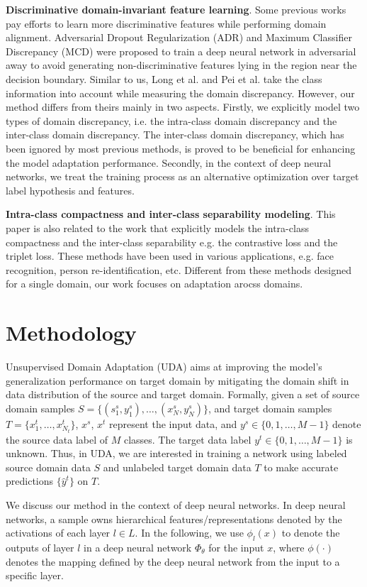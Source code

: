 \documentclass[conference]{IEEEtran}
\begin{document}
\textbf{Discriminative domain-invariant feature learning}. Some previous works pay efforts to learn more discriminative features while performing domain alignment.
Adversarial Dropout Regularization (ADR) and Maximum Classifier Discrepancy (MCD) were proposed to train a deep neural network in adversarial away to avoid generating non-discriminative features lying in the region near the decision boundary.
Similar to us, Long et al. and Pei et al. take the class information into account while measuring the domain discrepancy. However, our method differs from theirs mainly in two aspects.
Firstly, we explicitly model two types of domain discrepancy, i.e. the intra-class domain discrepancy and the inter-class domain discrepancy. The inter-class domain discrepancy, which has been ignored by most previous methods, 
is proved to be beneficial for enhancing the model adaptation performance. Secondly, in the context of deep neural networks, we treat the training process as an alternative optimization over target label hypothesis and features.

\textbf{Intra-class compactness and inter-class separability modeling}. This paper is also related to the work that explicitly models the intra-class compactness and the inter-class separability e.g. the contrastive loss and the triplet loss. These methods have been used in various applications, 
e.g. face recognition, person re-identification, etc. Different from these methods designed for a single domain, our work focuses on adaptation arocss domains.

\section{Methodology}
Unsupervised Domain Adaptation (UDA) aims at improving the model's generalization performance on target domain by mitigating the domain shift in data distribution of the source and target domain.
Formally, given a set of source domain samples $S = \{(s^s_1, y^s_1), \ldots, (x^s_N, y^s_N) \}$, and target domain samples $T = \{x^t_1, \ldots, x^t_{N_t}\}$, $x^s$, $x^t$ represent the input data, and $y^s \in \{0,1, \ldots, M-1\}$ denote the source data label of $M$ classes.
The target data label $y^t \in \{0,1, \ldots, M-1\}$ is unknown.
Thus, in UDA, we are interested in training a network using labeled source domain data $S$ and unlabeled target domain data $T$ to make accurate predictions $\{\hat{y}^t\}$ on $T$.

We discuss our method in the context of deep neural networks. In deep neural networks, a sample owns hierarchical features/representations denoted by the activations of each layer $l \in L$.
In the following, we use $\phi_l(x)$ to denote the outputs of layer $l$ in a deep neural network $\Phi_\theta$ for the input $x$, where $\phi(\cdot)$ denotes the mapping defined by the deep neural network from the input to a specific layer.
\end{document}
